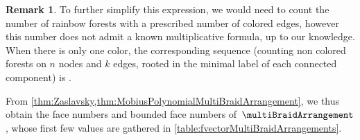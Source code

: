 \documentclass{amsart}
\theoremstyle{definition}
\newtheorem{remark}[theorem]{Remark}
\newcommand{\OEIS}[1]{\cite[{\rm \href{http://oeis.org/#1}{\texttt{#1}}}]{OEIS}}
\begin{document}
\begin{remark}
To further simplify this expression, we would need to count the number of rainbow forests with a prescribed number of colored edges, however this number does not admit a  known multiplicative formula, up to our knowledge. When there is only one color, the corresponding sequence (counting non colored forests on $n$ nodes and $k$ edges, rooted in the minimal label of each connected component) is \OEIS{A138464}.
\end{remark}


From \cref{thm:Zaslavsky,thm:MobiusPolynomialMultiBraidArrangement}, we thus obtain the face numbers and bounded face numbers of~$\multiBraidArrangement$, whose first few values are gathered in \cref{table:fvectorMultiBraidArrangements}.

\end{document}
